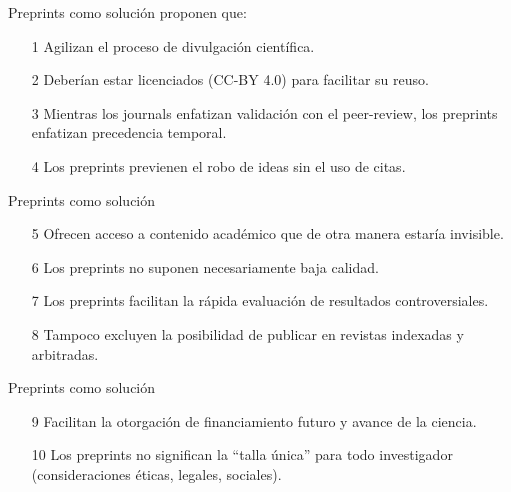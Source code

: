 \documentclass{beamer}
\begin{document}
\begin{frame}{Preprints como solución}
\Large \citeauthor{Bourne2017} \citeyear{Bourne2017} proponen que:
\begin{itemize}
\vspace{0.4cm}
\item[1] Agilizan el proceso de divulgación científica.
\pause
\vspace{0.4cm}
\item[2] Deberían estar licenciados (CC-BY 4.0) para facilitar su reuso.
\pause
\vspace{0.4cm}
\item[3] Mientras los journals enfatizan validación con el peer-review, los preprints enfatizan precedencia temporal.
\vspace{0.4cm}
\pause
\item[4] Los preprints previenen el robo de ideas sin el uso de citas.
\end{itemize}
\end{frame}


\begin{frame}{Preprints como solución}
\Large
\begin{itemize}
    \item[5] Ofrecen acceso a contenido académico que de otra manera estaría invisible.
    \vspace{0.4cm}
    \pause
    \item[6] Los preprints no suponen necesariamente baja calidad.
    \pause
    \vspace{0.4cm}
    \item[7] Los preprints facilitan la rápida evaluación de resultados controversiales.
    \pause
    \vspace{0.4cm}
    \item[8] Tampoco excluyen la posibilidad de publicar en revistas indexadas y arbitradas. 
\end{itemize}
\end{frame}

\begin{frame}{Preprints como solución}
\Large
\begin{itemize}
\item[9] Facilitan la otorgación de financiamiento futuro y avance de la ciencia.
\vspace{0.4cm}
\pause
\item[10] Los preprints no significan la ``talla única'' para todo investigador (consideraciones éticas, legales, sociales).  
\end{itemize}
\end{frame}
\end{document}
